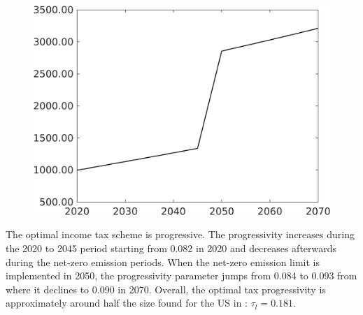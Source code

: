\begin{figure}[h!!]
\begin{minipage}[]{0.32\textwidth}
		\includegraphics[width=1\textwidth]{../../codding_model/own_basedOnFried/optimalPol_010922_revision/figures/all_13Sept22_Tplus30/Single_OPT_T_NoTaus_Tauf_regime0_spillover0_knspil0_noskill0_sep0_xgrowth0_extern0_PV1_sizeequ0_GOV0_etaa0.79.png}
	\end{minipage}
\end{figure} 

The optimal income tax scheme is progressive. The progressivity  increases during the 2020 to 2045 period starting from 0.082 in 2020  and decreases afterwards during the net-zero emission periods.  When the net-zero emission limit is implemented in 2050, the progressivity parameter jumps from 0.084 to 0.093 from where it  declines to 0.090 in 2070.
Overall, the optimal tax progressivity is approximately  around half the size found for the US in \cite{Heathcote2017OptimalFramework}: $\tau_{l}=0.181$.

